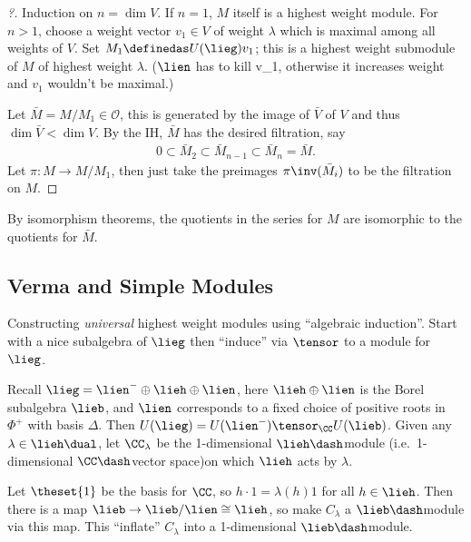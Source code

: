\begin{proof}[?]

Induction on \(n = \dim V\). If \(n=1\), \(M\) itself is a highest
weight module. For \(n > 1\), choose a weight vector \(v_1 \in V\) of
weight \(\lambda\) which is maximal among all weights of \(V\). Set
\(M_1 \definedas U(\lieg) v_1\); this is a highest weight submodule of
\(M\) of highest weight \(\lambda\). (\(\lien\) has to kill v\_1,
otherwise it increases weight and \(v_1\) wouldn't be maximal.)

Let \(\bar M = M/M_1 \in \mathcal O\), this is generated by the image of
\(\bar V\) of \(V\) and thus \(\dim \bar V < \dim V\). By the IH,
\(\bar M\) has the desired filtration, say
\begin{align*}0 \subset \bar M_2 \subset \bar M_{n-1} \subset \bar M_n = \bar M.\end{align*}
Let \(\pi: M \to M/M_1\), then just take the preimages
\(\pi\inv(\bar M_i)\) to be the filtration on \(M\).

\end{proof}

\begin{remark}

By isomorphism theorems, the quotients in the series for \(M\) are
isomorphic to the quotients for \(\bar M\).

\end{remark}

\hypertarget{verma-and-simple-modules}{%
\subsection{Verma and Simple Modules}\label{verma-and-simple-modules}}

Constructing \emph{universal} highest weight modules using ``algebraic
induction''. Start with a nice subalgebra of \(\lieg\) then ``induce''
via \(\tensor\) to a module for \(\lieg\).

Recall \(\lieg = \lien^- \oplus \lieh \oplus \lien\), here
\(\lieh \oplus \lien\) is the Borel subalgebra \(\lieb\), and \(\lien\)
corresponds to a fixed choice of positive roots in \(\Phi^+\) with basis
\(\Delta\). Then \(U(\lieg) = U(\lien^-) \tensor_\CC U(\lieb)\). Given
any \(\lambda \in \lieh\dual\), let \(\CC_\lambda\) be the 1-dimensional
\(\lieh\dash\)module (i.e.~1-dimensional \(\CC\dash\)vector space)on
which \(\lieh\) acts by \(\lambda\).

Let \(\theset{1}\) be the basis for \(\CC\), so
\(h \cdot 1 = \lambda(h)1\) for all \(h\in \lieh\). Then there is a map
\(\lieb \to \lieb / \lien \cong \lieh\), so make \(C_\lambda\) a
\(\lieb\dash\)module via this map. This ``inflate'' \(C_\lambda\) into a
1-dimensional \(\lieb\dash\)module.

